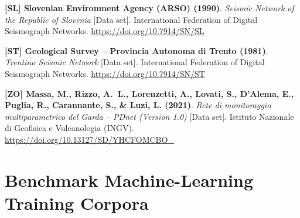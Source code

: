 \begin{enumerate}[label={[\textbf{\arabic*}]},leftmargin=*]
  \item \textbf{[SL] Slovenian Environment Agency (ARSO) (1990)}.
    \textit{Seismic Network of the Republic of Slovenia} [Data set].
    International Federation of Digital Seismograph Networks.
    \url{https://doi.org/10.7914/SN/SL}

  \item \textbf{[ST] Geological Survey -- Provincia Autonoma di Trento (1981)}.
    \textit{Trentino Seismic Network} [Data set].
    International Federation of Digital Seismograph Networks.
    \url{https://doi.org/10.7914/SN/ST}

  \item \textbf{[ZO] Massa, M., Rizzo, A.~L., Lorenzetti, A.,
    Lovati, S., D'Alema, E., Puglia, R., Carannante, S., \& Luzi, L. (2021)}.
    \textit{Rete di monitoraggio multiparametrico del Garda -- PDnet
    (Version 1.0)} [Data set].
    Istituto Nazionale di Geofisica e Vulcanologia (INGV).
    \url{https://doi.org/10.13127/SD/YHCFOMCBO_}
\end{enumerate}

\section*{Benchmark Machine-Learning Training Corpora}

